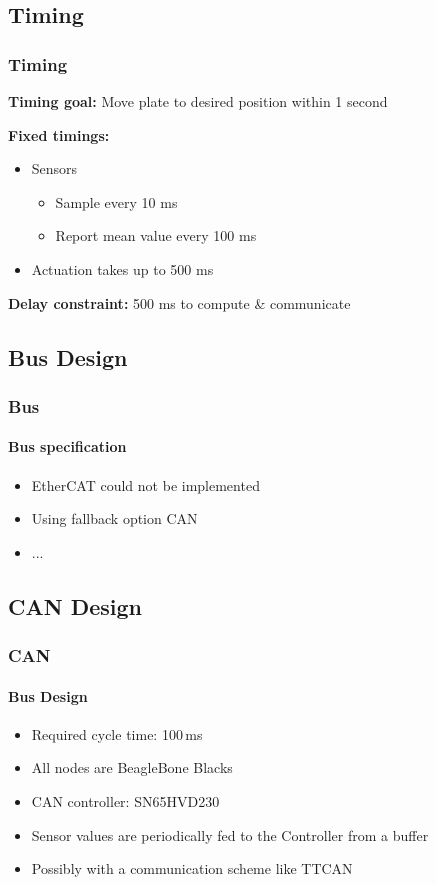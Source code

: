 \documentclass{beamer}
\begin{document}
\subsection{Timing}
\begin{frame}
  \frametitle{Timing}
  \textbf{Timing goal:} Move plate to desired position within 1 second

  \vfill

  \textbf{Fixed timings:}
  \begin{itemize}
    \item Sensors
      \begin{itemize}
        \item Sample every 10 ms
        \item Report mean value every 100 ms
      \end{itemize}
    \item Actuation takes up to 500 ms
  \end{itemize}

  \vfill

  \textbf{Delay constraint:} 500 ms to compute \& communicate
\end{frame}

\subsection{Bus Design}
\begin{frame}
  \frametitle{Bus}
  \framesubtitle{Bus specification}
  \begin{itemize}
    \item EtherCAT could not be implemented
    \item Using fallback option CAN
    \item ...
  \end{itemize}
\end{frame}

\subsection{CAN Design}
\begin{frame}
  \frametitle{CAN}
  \framesubtitle{Bus Design}
  \begin{itemize}
    \item Required cycle time: 100\,ms
    \item All nodes are BeagleBone Blacks
    \item CAN controller: SN65HVD230
    \item Sensor values are periodically fed to the Controller from a buffer
    \item Possibly with a communication scheme like TTCAN
  \end{itemize}
\end{frame}
\end{document}
